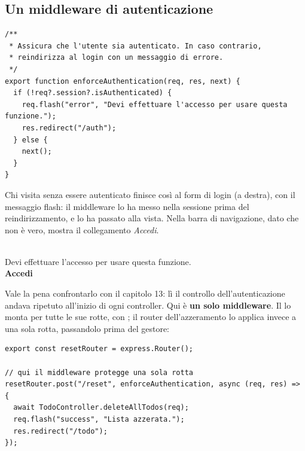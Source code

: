 \subsection{Un middleware di autenticazione}

\begin{lstlisting}[style=js, name=middleware/authorization.js]
/**
 * Assicura che l'utente sia autenticato. In caso contrario,
 * reindirizza al login con un messaggio di errore.
 */
export function enforceAuthentication(req, res, next) {
  if (!req?.session?.isAuthenticated) {
    req.flash("error", "Devi effettuare l'accesso per usare questa funzione.");
    res.redirect("/auth");
  } else {
    next();
  }
}
\end{lstlisting}

\begin{affianco}[0.48][c]
Chi visita  senza essere autenticato finisce così al form di login
(a destra), con il messaggio flash: il middleware lo ha messo nella sessione
prima del reindirizzamento, e  lo ha passato
alla vista. Nella barra di navigazione, dato che  non è
vero,  mostra il collegamento \textit{Accedi}.
\risultato
\begin{browser}
  \Lato\small
  \quad{}\\[6pt]
  {\color{css-crimson}Devi effettuare l'accesso per usare questa funzione.}\\[6pt]
  {\bfseries\LARGE Accedi}\\[8pt]
\end{browser}
\end{affianco}

Vale la pena confrontarlo con il capitolo 13: lì il controllo
dell'autenticazione andava ripetuto all'inizio di ogni controller. Qui è
\textbf{un solo middleware}. Il  lo monta per tutte le sue
rotte, con ; il router dell'azzeramento lo applica invece a
una sola rotta, passandolo prima del gestore:

\begin{lstlisting}[style=js, name=routes/resetRouter.js, firstnumber=5]
export const resetRouter = express.Router();

// qui il middleware protegge una sola rotta
resetRouter.post("/reset", enforceAuthentication, async (req, res) => {
  await TodoController.deleteAllTodos(req);
  req.flash("success", "Lista azzerata.");
  res.redirect("/todo");
});
\end{lstlisting}

